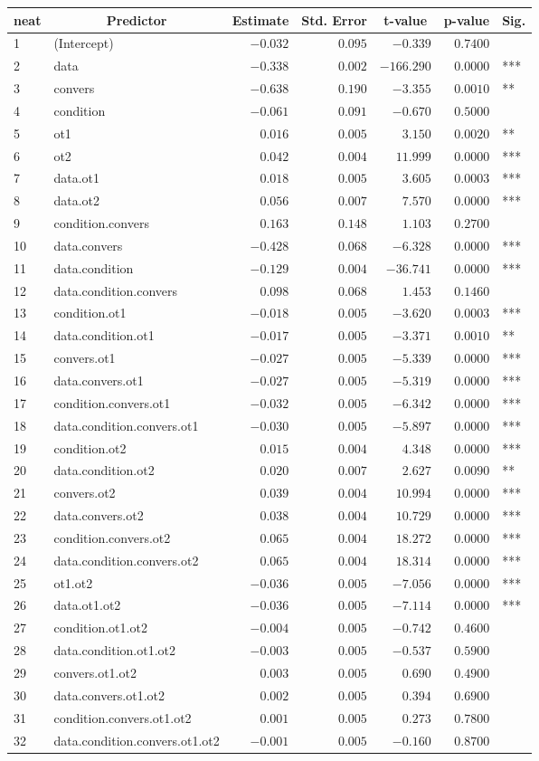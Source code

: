 \begin{table}[!tbp]
\begin{center}
\begin{tabular}{llrrrrl}
\hline\hline
\multicolumn{1}{l}{neat}&\multicolumn{1}{c}{Predictor}&\multicolumn{1}{c}{Estimate}&\multicolumn{1}{c}{Std. Error}&\multicolumn{1}{c}{t-value}&\multicolumn{1}{c}{p-value}&\multicolumn{1}{c}{Sig.}\tabularnewline
\hline
1&(Intercept)&$-0.032$&$0.095$&$  -0.339$&$0.7400$& \tabularnewline
2&data&$-0.338$&$0.002$&$-166.290$&$0.0000$&***\tabularnewline
3&convers&$-0.638$&$0.190$&$  -3.355$&$0.0010$&**\tabularnewline
4&condition&$-0.061$&$0.091$&$  -0.670$&$0.5000$& \tabularnewline
5&ot1&$ 0.016$&$0.005$&$   3.150$&$0.0020$&**\tabularnewline
6&ot2&$ 0.042$&$0.004$&$  11.999$&$0.0000$&***\tabularnewline
7&data.ot1&$ 0.018$&$0.005$&$   3.605$&$0.0003$&***\tabularnewline
8&data.ot2&$ 0.056$&$0.007$&$   7.570$&$0.0000$&***\tabularnewline
9&condition.convers&$ 0.163$&$0.148$&$   1.103$&$0.2700$& \tabularnewline
10&data.convers&$-0.428$&$0.068$&$  -6.328$&$0.0000$&***\tabularnewline
11&data.condition&$-0.129$&$0.004$&$ -36.741$&$0.0000$&***\tabularnewline
12&data.condition.convers&$ 0.098$&$0.068$&$   1.453$&$0.1460$& \tabularnewline
13&condition.ot1&$-0.018$&$0.005$&$  -3.620$&$0.0003$&***\tabularnewline
14&data.condition.ot1&$-0.017$&$0.005$&$  -3.371$&$0.0010$&**\tabularnewline
15&convers.ot1&$-0.027$&$0.005$&$  -5.339$&$0.0000$&***\tabularnewline
16&data.convers.ot1&$-0.027$&$0.005$&$  -5.319$&$0.0000$&***\tabularnewline
17&condition.convers.ot1&$-0.032$&$0.005$&$  -6.342$&$0.0000$&***\tabularnewline
18&data.condition.convers.ot1&$-0.030$&$0.005$&$  -5.897$&$0.0000$&***\tabularnewline
19&condition.ot2&$ 0.015$&$0.004$&$   4.348$&$0.0000$&***\tabularnewline
20&data.condition.ot2&$ 0.020$&$0.007$&$   2.627$&$0.0090$&**\tabularnewline
21&convers.ot2&$ 0.039$&$0.004$&$  10.994$&$0.0000$&***\tabularnewline
22&data.convers.ot2&$ 0.038$&$0.004$&$  10.729$&$0.0000$&***\tabularnewline
23&condition.convers.ot2&$ 0.065$&$0.004$&$  18.272$&$0.0000$&***\tabularnewline
24&data.condition.convers.ot2&$ 0.065$&$0.004$&$  18.314$&$0.0000$&***\tabularnewline
25&ot1.ot2&$-0.036$&$0.005$&$  -7.056$&$0.0000$&***\tabularnewline
26&data.ot1.ot2&$-0.036$&$0.005$&$  -7.114$&$0.0000$&***\tabularnewline
27&condition.ot1.ot2&$-0.004$&$0.005$&$  -0.742$&$0.4600$& \tabularnewline
28&data.condition.ot1.ot2&$-0.003$&$0.005$&$  -0.537$&$0.5900$& \tabularnewline
29&convers.ot1.ot2&$ 0.003$&$0.005$&$   0.690$&$0.4900$& \tabularnewline
30&data.convers.ot1.ot2&$ 0.002$&$0.005$&$   0.394$&$0.6900$& \tabularnewline
31&condition.convers.ot1.ot2&$ 0.001$&$0.005$&$   0.273$&$0.7800$& \tabularnewline
32&data.condition.convers.ot1.ot2&$-0.001$&$0.005$&$  -0.160$&$0.8700$& \tabularnewline
\hline
\end{tabular}\end{center}
\end{table}
